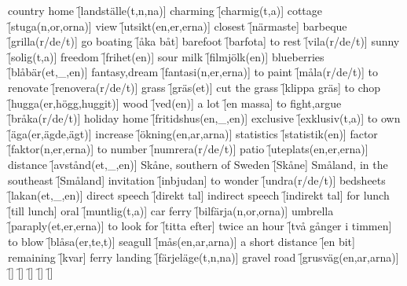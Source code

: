 \begin{questions}
    \begin{multicols}{2}
        \raggedcolumns
        \question country home \f[landställe(t,n,na)]
        \question charming \f[charmig(t,a)]
        \question cottage \f[stuga(n,or,orna)]
        \question view \f[utsikt(en,er,erna)]
        \question closest \f[närmaste]
        \question barbeque \f[grilla(r/de/t)]
        \question go boating \f[åka båt]
        \question barefoot \f[barfota]
        \question to rest \f[vila(r/de/t)]
        \question sunny \f[solig(t,a)]
        \question freedom \f[frihet(en)]
        \question sour milk \f[filmjölk(en)]
        \question blueberries \f[blåbär(et,\_,en)]
        \question fantasy,dream \f[fantasi(n,er,erna)]
        \question to paint \f[måla(r/de/t)]
        \question to renovate \f[renovera(r/de/t)]
        \question grass \f[gräs(et)]
        \question cut the grass \f[klippa gräs]
        \question to chop \f[hugga(er,högg,huggit)]
        \question wood \f[ved(en)]
        \question a lot \f[en massa]
        \question to fight,argue \f[bråka(r/de/t)]
        \question holiday home \f[fritidshus(en,\_,en)]
        \question exclusive \f[exklusiv(t,a)]
        \question to own \f[äga(er,ägde,ägt)]
        \question increase \f[ökning(en,ar,arna)]
        \question statistics \f[statistik(en)]
        \question factor \f[faktor(n,er,erna)]
        \question to number \f[numrera(r/de/t)]
        \question patio \f[uteplats(en,er,erna)]
        \question distance \f[avstånd(et,\_,en)]
        \question Skåne, southern of Sweden \f[Skåne]
        \question Småland, in the southeast \f[Småland]
        \question invitation \f[inbjudan]
        \question to wonder \f[undra(r/de/t)]
        \question bedsheets \f[lakan(et,\_,en)]
        \question direct speech \f[direkt tal]
        \question indirect speech \f[indirekt tal]
        \question for lunch \f[till lunch]
        \question oral \f[muntlig(t,a)]
        \question car ferry \f[bilfärja(n,or,orna)]
        \question umbrella \f[paraply(et,er,erna)]
        \question to look for \f[titta efter]
        \question twice an hour \f[två gånger i timmen]
        \question to blow \f[blåsa(er,te,t)]
        \question seagull \f[mås(en,ar,arna)]
        \question a short distance \f[en bit]
        \question remaining \f[kvar]
        \question ferry landing \f[färjeläge(t,n,na)]
        \question gravel road \f[grusväg(en,ar,arna)]
        \question  \f[]
        \question  \f[]
        \question  \f[]
        \question  \f[]
        \question  \f[]

\end{multicols}
\end{questions}
